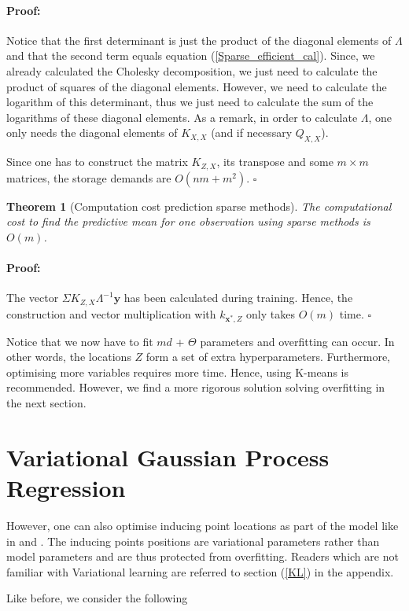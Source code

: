 \documentclass[12pt,a4paper,oneside]{book}
\newtheorem{Theorem}{Theorem}
\newenvironment{proof}{\paragraph{Proof:}}{\hfill$\square$}
\begin{document}
\begin{proof}
Notice that the first determinant is just the product of the diagonal elements of $\Lambda$ and that the second term equals equation (\ref{Sparse_efficient_cal}). Since, we already calculated the Cholesky decomposition, we just need to calculate the product of squares of the diagonal elements. However, we need to calculate the logarithm of this determinant, thus we just need to calculate the sum of the logarithms of these diagonal elements. As a remark, in order to calculate $\Lambda$, one only needs the diagonal elements of $K_{X,X}$ (and if necessary $Q_{X,X}$).

Since one has to construct the matrix $K_{Z,X}$, its transpose and some $m \times m$ matrices, the storage demands are $O(nm +m^2)$.
\end{proof}

\begin{Theorem}[Computation cost prediction sparse methods]
The computational cost to find the predictive mean for one observation using sparse methods is $O(m)$.
\end{Theorem}

\begin{proof}
The vector $\Sigma K_{Z,X}\Lambda^{-1} \bm{y}$ has been calculated during training. Hence, the construction and vector multiplication with $k_{\bm{x}^{\ast},Z}$ only takes $O(m)$ time. 
\end{proof}

Notice that we now have to fit $md$ + $\Theta$ parameters and overfitting can occur. In other words, the locations $Z$ form a set of extra hyperparameters. Furthermore, optimising more variables requires more time. Hence, using K-means is recommended. However, we find a more rigorous solution solving overfitting in the next section. 


\section{Variational Gaussian Process Regression}\label{var_regr}

However, one can also optimise inducing point locations as part of the model like in \cite{titsias2009variational} and \cite{hensman2013gaussian}. The inducing points positions are variational parameters rather than model parameters and are thus protected from overfitting. Readers which are not familiar with Variational learning are referred to section (\ref{KL}) in the appendix.

Like before, we consider the following 
\end{document}
